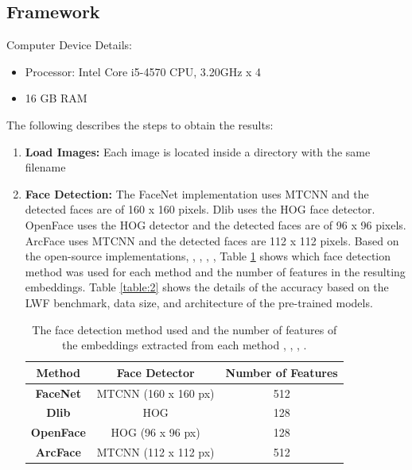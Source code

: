 \documentclass[12pt,english]{article}
\begin{document}
\subsection{Framework}
\quad
Computer Device Details:
\begin{itemize}
\item Processor: Intel Core i5-4570 CPU, 3.20GHz x 4
\item 16 GB RAM
\end{itemize}

The following describes the steps to obtain the results:

\begin{enumerate}
\item \textbf{Load Images: } Each image is located inside a directory with the same filename
\item \textbf{Face Detection: } The FaceNet implementation uses MTCNN and the detected faces are of 160 x 160 pixels. Dlib uses the HOG face detector. OpenFace uses the HOG detector and the detected faces are of 96 x 96 pixels. ArcFace uses MTCNN and the detected faces are 112 x 112 pixels. Based on the open-source implementations, \cite{sandberg}, \cite{geitgey}, \cite{amos2016}, \cite{deng2019}, Table \ref{table:1} shows which face detection method was used for each method and the number of features in the resulting embeddings. Table \ref{table:2} shows the details of the accuracy based on the LWF benchmark, data size, and architecture of the pre-trained models.

\begin{table}[h!]
\centering
\begin{tabular}{||c c c||} 
 \hline
  Method & Face Detector & Number of Features\\ [0.5ex]
 \hline\hline
 \textbf{FaceNet} & MTCNN (160 x 160 px) & 512\\ 
 \hline
 \textbf{Dlib} & HOG & 128\\
 \hline
 \textbf{OpenFace} & HOG (96 x 96 px) & 128\\
 \hline
 \textbf{ArcFace} & MTCNN (112 x 112 px) & 512\\
 \hline
\end{tabular}
\caption{The face detection method used and the number of features of the embeddings extracted from each method \cite{sandberg}, \cite{geitgey}, \cite{amos2016}, \cite{deng2019}.}
\label{table:1}
\end{table}


\end{enumerate}
\end{document}
